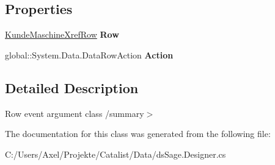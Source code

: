 \subsection*{Properties}
\begin{DoxyCompactItemize}
\item 
\hyperlink{class_products_1_1_data_1_1ds_sage_1_1_kunde_maschine_xref_row}{Kunde\+Maschine\+Xref\+Row} {\bfseries Row}\hypertarget{class_products_1_1_data_1_1ds_sage_1_1_kunde_maschine_xref_row_change_event_a0007c9503aba8fe1a41a97c14adefc0b}{}\label{class_products_1_1_data_1_1ds_sage_1_1_kunde_maschine_xref_row_change_event_a0007c9503aba8fe1a41a97c14adefc0b}

\item 
global\+::\+System.\+Data.\+Data\+Row\+Action {\bfseries Action}\hypertarget{class_products_1_1_data_1_1ds_sage_1_1_kunde_maschine_xref_row_change_event_a502a5500865e2b37e44f52d15625887b}{}\label{class_products_1_1_data_1_1ds_sage_1_1_kunde_maschine_xref_row_change_event_a502a5500865e2b37e44f52d15625887b}

\end{DoxyCompactItemize}


\subsection{Detailed Description}
Row event argument class /summary$>$ 

The documentation for this class was generated from the following file\+:\begin{DoxyCompactItemize}
\item 
C\+:/\+Users/\+Axel/\+Projekte/\+Catalist/\+Data/ds\+Sage.\+Designer.\+cs\end{DoxyCompactItemize}
